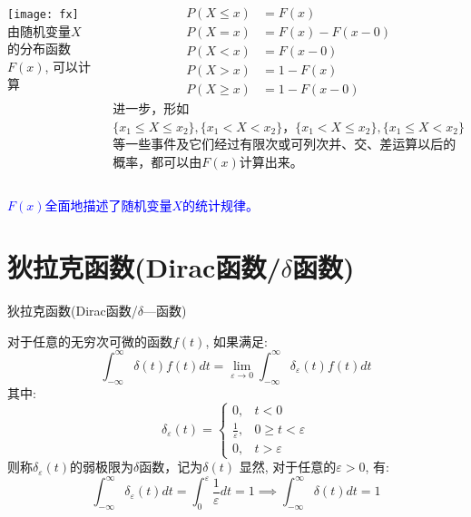 \begin{frame}
\begin{columns}
\texttt{[image: fx]}
由随机变量$X$的分布函数$F(x)$, 可以计算
\begin{block}{}
\begin{align*}
P(X \le x) &= F(x)\\
P(X = x) &= F(x)-F(x-0) \\
P(X < x) &= F(x-0) \\
P(X > x) &= 1- F(x) \\
P(X \ge x) &= 1-F(x-0)
\end{align*}
进一步，形如$\{x_1\le X\le x_2\},\{x_1< X< x_2\}，\{x_1< X\le x_2\}, \{x_1\le X< x_2\}$等一些事件及它们经过有限次或可列次并、交、差运算以后的概率，都可以由$F(x)$计算出来。
\end{block}
\end{columns}
\begin{block}{}
\textcolor{blue}{$F(x)$全面地描述了随机变量$X$的统计规律。}
\end{block}
\end{frame}

\section{狄拉克函数(Dirac函数/$\delta$函数)}

\begin{frame}{狄拉克函数(Dirac函数/$\delta$---函数)}
\begin{definition}[$\delta$---函数]
	对于任意的无穷次可微的函数$f(t)$, 如果满足:
	$$\int_{-\infty}^{\infty}\delta (t)f(t)dt=\lim\limits_{\varepsilon\to 0}\int_{-\infty}^{\infty}\delta_{\varepsilon}(t)f(t)dt $$
	其中:
	\[
	\delta_{\varepsilon}(t)=\begin{cases}
	0,&t<0\\
	\frac{1}{\varepsilon}, & 0\ge t<\varepsilon\\
	0, &t>\varepsilon
	\end{cases}
	\]
	则称$\delta_\varepsilon(t)$的弱极限为$\delta$函数，记为$\delta(t)$
	显然, 对于任意的$\varepsilon>0$, 有:
	$$\int_{-\infty}^{\infty}\delta_{\varepsilon}(t)dt=\int_{0}^{\varepsilon}\frac{1}{\varepsilon}dt=1\implies \int_{-\infty}^\infty\delta(t)dt=1$$
\end{definition}
\end{frame}

